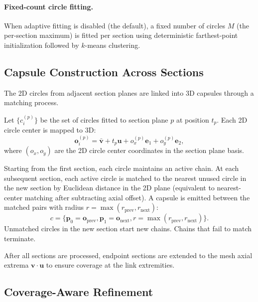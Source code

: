 \paragraph{Fixed-count circle fitting.}
When adaptive fitting is disabled (the default), a fixed number of circles $M$ (the per-section maximum) is fitted per section using deterministic farthest-point initialization followed by $k$-means clustering.

\subsection{Capsule Construction Across Sections}

The 2D circles from adjacent section planes are linked into 3D capsules through a matching process.

Let $\{c_{i}^{(p)}\}$ be the set of circles fitted to section plane $p$ at position $t_p$.
Each 2D circle center is mapped to 3D:
\begin{equation}
\mathbf{o}_{i}^{(p)} = \bar{\mathbf{v}} + t_p \mathbf{u} + o_x^{(p)} \mathbf{e}_1 + o_y^{(p)} \mathbf{e}_2,
\end{equation}
where $(o_x, o_y)$ are the 2D circle center coordinates in the section plane basis.

Starting from the first section, each circle maintains an active chain.
At each subsequent section, each active circle is matched to the nearest unused circle in the new section by Euclidean distance in the 2D plane (equivalent to nearest-center matching after subtracting axial offset).
A capsule is emitted between the matched pairs with radius $r = \max(r_{\text{prev}}, r_{\text{next}})$:
\begin{equation}
c = \{ \mathbf{p}_0 = \mathbf{o}_{\text{prev}}, \mathbf{p}_1 = \mathbf{o}_{\text{next}}, r = \max(r_{\text{prev}}, r_{\text{next}}) \}.
\end{equation}
Unmatched circles in the new section start new chains.
Chains that fail to match terminate.

After all sections are processed, endpoint sections are extended to the mesh axial extrema $\mathbf{v} \cdot \mathbf{u}$ to ensure coverage at the link extremities.

\subsection{Coverage-Aware Refinement}

